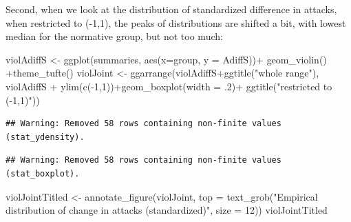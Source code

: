\documentclass[
  10pt,
  dvipsnames,enabledeprecatedfontcommands]{scrartcl}
\newenvironment{Shaded}{\begin{snugshade}}{\end{snugshade}}
\newcommand{\AttributeTok}[1]{\textcolor[rgb]{0.77,0.63,0.00}{#1}}
\newcommand{\DecValTok}[1]{\textcolor[rgb]{0.00,0.00,0.81}{#1}}
\newcommand{\FunctionTok}[1]{\textcolor[rgb]{0.00,0.00,0.00}{#1}}
\newcommand{\NormalTok}[1]{#1}
\newcommand{\OtherTok}[1]{\textcolor[rgb]{0.56,0.35,0.01}{#1}}
\newcommand{\SpecialCharTok}[1]{\textcolor[rgb]{0.00,0.00,0.00}{#1}}
\newcommand{\StringTok}[1]{\textcolor[rgb]{0.31,0.60,0.02}{#1}}
\begin{document}

Second, when we look at the distribution of standardized difference in
attacks, when restricted to (-1,1), the peaks of distributions are
shifted a bit, with lowest median for the normative group, but not too
much:

\vspace{1mm}
\footnotesize

\begin{Shaded}
\begin{Highlighting}[]
\NormalTok{violAdiffS }\OtherTok{\textless{}{-}} \FunctionTok{ggplot}\NormalTok{(summaries, }\FunctionTok{aes}\NormalTok{(}\AttributeTok{x=}\NormalTok{group, }\AttributeTok{y =}\NormalTok{ AdiffS))}\SpecialCharTok{+}
  \FunctionTok{geom\_violin}\NormalTok{() }\SpecialCharTok{+}\FunctionTok{theme\_tufte}\NormalTok{() }
\NormalTok{violJoint }\OtherTok{\textless{}{-}} \FunctionTok{ggarrange}\NormalTok{(violAdiffS}\SpecialCharTok{+}\FunctionTok{ggtitle}\NormalTok{(}\StringTok{"whole range"}\NormalTok{),}
\NormalTok{              violAdiffS }\SpecialCharTok{+} \FunctionTok{ylim}\NormalTok{(}\FunctionTok{c}\NormalTok{(}\SpecialCharTok{{-}}\DecValTok{1}\NormalTok{,}\DecValTok{1}\NormalTok{))}\SpecialCharTok{+}\FunctionTok{geom\_boxplot}\NormalTok{(}\AttributeTok{width =}\NormalTok{ .}\DecValTok{2}\NormalTok{)}\SpecialCharTok{+}
              \FunctionTok{ggtitle}\NormalTok{(}\StringTok{"restricted to ({-}1,1)"}\NormalTok{)) }
\end{Highlighting}
\end{Shaded}

\begin{verbatim}
## Warning: Removed 58 rows containing non-finite values (stat_ydensity).
\end{verbatim}

\begin{verbatim}
## Warning: Removed 58 rows containing non-finite values (stat_boxplot).
\end{verbatim}

\begin{Shaded}
\begin{Highlighting}[]
\NormalTok{violJointTitled }\OtherTok{\textless{}{-}} \FunctionTok{annotate\_figure}\NormalTok{(violJoint, }
  \AttributeTok{top =} \FunctionTok{text\_grob}\NormalTok{(}\StringTok{"Empirical distribution of change in attacks (standardized)"}\NormalTok{,}
                  \AttributeTok{size =} \DecValTok{12}\NormalTok{))}
\NormalTok{violJointTitled}
\end{Highlighting}
\end{Shaded}
\end{document}
